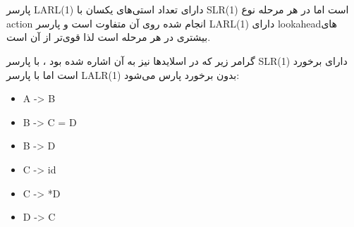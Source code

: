 \\
\\
پارسر LARL(1) دارای تعداد استی‌های یکسان با SLR(1)
است اما در هر مرحله نوع action انجام شده روی آن متفاوت است و پارسر
LARL(1)
دارای lookaheadهای بیشتری در هر مرحله است لذا 
قوی‌تر از آن است. 


گرامر زیر که در اسلایدها نیز به آن اشاره شده بود ، با پارسر SLR(1) دارای برخورد است اما با پارسر 
LALR(1)
بدون برخورد پارس می‌شود:
\begin{latin}
\begin{itemize}
    \item 
    A -> B
    \item
    B -> C = D
    \item
    B -> D
    \item
    C -> id
    \item
    C -> *D
    \item
    D -> C
\end{itemize}
\end{latin}
